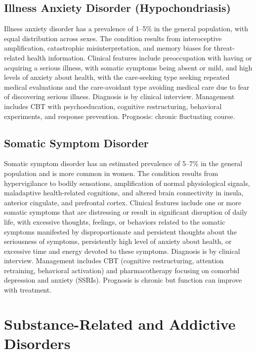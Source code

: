 \subsection{Illness Anxiety Disorder (Hypochondriasis)}
\label{sec:Illness Anxiety Disorder (Hypochondriasis)}
Illness anxiety disorder has a prevalence of 1--5\% in the general population, with equal distribution across sexes. The condition results from interoceptive amplification, catastrophic misinterpretation, and memory biases for threat-related health information. Clinical features include preoccupation with having or acquiring a serious illness, with somatic symptoms being absent or mild, and high levels of anxiety about health, with the care-seeking type seeking repeated medical evaluations and the care-avoidant type avoiding medical care due to fear of discovering serious illness. Diagnosis is by clinical interview. Management includes CBT with psychoeducation, cognitive restructuring, behavioral experiments, and response prevention. Prognosis: chronic fluctuating course.

\subsection{Somatic Symptom Disorder}
\label{sec:Somatic Symptom Disorder}
Somatic symptom disorder has an estimated prevalence of 5--7\% in the general population and is more common in women. The condition results from hypervigilance to bodily sensations, amplification of normal physiological signals, maladaptive health-related cognitions, and altered brain connectivity in insula, anterior cingulate, and prefrontal cortex. Clinical features include one or more somatic symptoms that are distressing or result in significant disruption of daily life, with excessive thoughts, feelings, or behaviors related to the somatic symptoms manifested by disproportionate and persistent thoughts about the seriousness of symptoms, persistently high level of anxiety about health, or excessive time and energy devoted to these symptoms. Diagnosis is by clinical interview. Management includes CBT (cognitive restructuring, attention retraining, behavioral activation) and pharmacotherapy focusing on comorbid depression and anxiety (SSRIs). Prognosis is chronic but function can improve with treatment.

\section{Substance-Related and Addictive Disorders}

